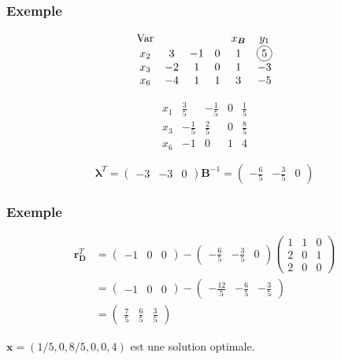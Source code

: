 \documentclass[usepdftitle=false]{beamer}
\newcommand*\circled[1]{\tikz[baseline=(char.base)]{
    \node[shape=circle,draw,inner sep=2pt] (char) {#1};}}
\def\br{\boldsymbol{r}}
\def\bx{\boldsymbol{x}}
\def\bB{\boldsymbol{B}}
\def\bD{\boldsymbol{D}}
\def\blambda{\boldsymbol{\lambda}}
\begin{document}
\begin{frame}
\frametitle{Exemple}

\[
\begin{matrix}
\mbox{Var} & & & & x_{\bB} & y_1 \\
x_2 & 3 & -1 & 0 & 1 & \circled{5} \\
x_3 & -2 & 1 & 0 & 1 & -3 \\
x_6 & -4 & 1 & 1 & 3 & -5
\end{matrix}
\]

\mbox{}

\[
\begin{matrix}
x_1 & \frac{3}{5} & -\frac{1}{5} & 0 & \frac{1}{5} \\
x_3 & -\frac{1}{5} & \frac{2}{5} & 0 & \frac{8}{5} \\
x_6 & -1 & 0 & 1 & 4 
\end{matrix}
\]

\mbox{}

\[
\blambda^T =
\begin{pmatrix}
-3 & -3 & 0
\end{pmatrix}
\bB^{-1}
=
\begin{pmatrix}
-\frac{6}{5} & -\frac{3}{5} & 0
\end{pmatrix}
\]

\end{frame}

\begin{frame}
\frametitle{Exemple}

\begin{align*}
\br_{\bD}^T & =
\begin{pmatrix}
-1 & 0 & 0
\end{pmatrix}
-
\begin{pmatrix}
-\frac{6}{5} & -\frac{3}{5} & 0
\end{pmatrix}
\begin{pmatrix}
 1 & 1 & 0 \\
 2 & 0 & 1 \\
 2 & 0 & 0
\end{pmatrix} \\
& =
\begin{pmatrix}
-1 & 0 & 0
\end{pmatrix}
-
\begin{pmatrix}
-\frac{12}{5} & -\frac{6}{5} & -\frac{3}{5}
\end{pmatrix} \\
& =
\begin{pmatrix}
\frac{7}{5} & \frac{6}{5} & \frac{3}{5}
\end{pmatrix}
\end{align*}

\mbox{}

$\bx = ( 1/5, 0, 8/5, 0, 0, 4)$ est une solution optimale.

\end{frame}
\end{document}
